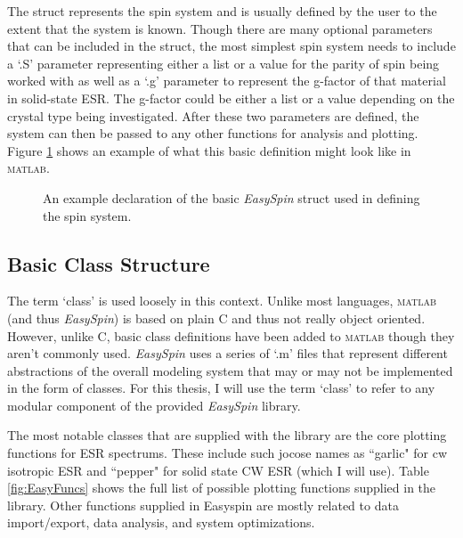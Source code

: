 \documentclass[oneside, astronomy, noacknowlegments]{BYUPhys}
\begin{document}
The struct represents the spin system and is usually defined by the user to the extent that the system is known. Though there are many optional parameters that can be included in the struct, the most simplest spin system needs to include a `.S' parameter representing either a list or a value for the parity of spin being worked with as well as a `.g' parameter to represent the g-factor of that material in solid-state ESR. The g-factor could be either a list or a value depending on the crystal type being investigated. After these two parameters are defined, the system can then be passed to any other functions for analysis and plotting. Figure \ref{fig:SpinDefinition} shows an example of what this basic definition might look like in \textsc{matlab}.

\begin{figure}
    \caption[Simple Spin System Definition]{\label{fig:SpinDefinition}
     An example declaration of the basic \textit{EasySpin} struct used in defining the spin system.}
 \end{figure}

\subsection{Basic Class Structure}

The term `class' is used loosely in this context. Unlike most languages, \textsc{matlab} (and thus \textit{EasySpin}) is based on plain C and thus not really object oriented. However, unlike C, basic class definitions have been added to \textsc{matlab} though they aren't commonly used. \textit{EasySpin} uses a series of `.m' files that represent different abstractions of the overall modeling system that may or may not be implemented in the form of classes. For this thesis, I will use the term `class' to refer to any modular component of the provided \textit{EasySpin} library.

The most notable classes that are supplied with the library are the core plotting functions for ESR spectrums. These include such jocose names as ``garlic" for cw isotropic ESR and ``pepper" for solid state CW ESR (which I will use). Table \ref{fig:EasyFuncs} shows the full list of possible plotting functions supplied in the library. Other functions supplied in Easyspin are mostly related to data import/export, data analysis, and system optimizations.
\end{document}
